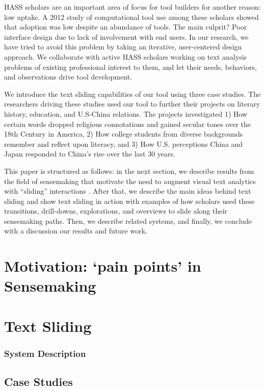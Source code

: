 \documentclass{sig-alternate}
\begin{document}
HASS scholars are an important area of focus for tool builders for another reason: low uptake. A 2012 study of computational tool use among these scholars showed that adoption was low despite an abundance of tools. The main culprit? Poor interface design due to lack of involvement with end users. In our research, we have tried to avoid this problem by taking an iterative, user-centered design approach. We collaborate with active HASS scholars working on text analysis problems of existing professional interest to them, and let their needs, behaviors, and observations drive tool development.

We introduce the text sliding capabilities of our tool using three case studies. The researchers driving these studies used our tool to further their projects on literary history, education, and U.S-China relations. The projects investigated 1) How certain words dropped religious connotations and gained secular tones over the 18th Century in America, 2) How college students from diverse backgrounds remember and reflect upon literacy, and 3) How U.S. perceptions China and Japan responded to China's rise over the last 30 years.

This paper is structured as follows: in the next section, we describe results from the field of sensemaking that motivate the need to augment visual text analytics with ``sliding'' interactions . After that, we describe the main ideas behind text sliding and show text sliding in action with examples of how scholars used these transitions, drill-downs, explorations, and overviews to slide along their sensemaking paths. Then, we describe related systems, and finally, we conclude with a discussion our results and future work.

\section{Motivation: `pain points' in Sensemaking}

\section{Text Sliding}

\subsubsection{System Description}

\subsection{Case Studies}
\end{document}
